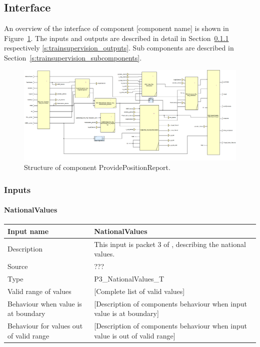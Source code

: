 \subsection{Interface}

An overview of the interface of component [component name] is shown in Figure~\ref{f:ssv}. The inputs and outputs are described in detail in Section~\ref{s:trainsupervision_inputs} respectively \ref{s:trainsupervision_outputs}. Sub components are described in Section~\ref{s:trainsupervision_subcomponents}.

\begin{figure}
\centering
\includegraphics[width=0.95\textheight, angle=90]{../images/speedsupervision.png}
\caption{Structure of component ProvidePositionReport.}\label{f:ssv}
\end{figure}



\subsubsection{Inputs}\label{s:trainsupervision_inputs}

\paragraph{NationalValues}

\begin{longtable}{p{}p{}}
\toprule
Input name				& NationalValues \\
\midrule
Description				& This input is packet 3 of \cite[Chapt.~8]{subset-026}, describing the national values.  \\
\midrule
Source					& ??? \\ 
\midrule
Type					& P3\_NationalValues\_T \\
\midrule
Valid range of values	& [Complete list of valid values] \\
\midrule
Behaviour when value is at boundary	& [Description of components behaviour when input value is at boundary] \\
\midrule
Behaviour for values out of valid range	& [Description of components behaviour when input value is out of valid range] \\
\bottomrule
\end{longtable}


